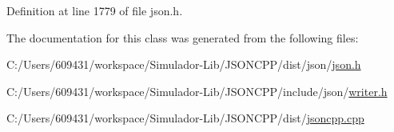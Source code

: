 Definition at line 1779 of file json.\+h.



The documentation for this class was generated from the following files\+:\begin{DoxyCompactItemize}
\item 
C\+:/\+Users/609431/workspace/\+Simulador-\/\+Lib/\+J\+S\+O\+N\+C\+P\+P/dist/json/\hyperlink{dist_2json_2json_8h}{json.\+h}\item 
C\+:/\+Users/609431/workspace/\+Simulador-\/\+Lib/\+J\+S\+O\+N\+C\+P\+P/include/json/\hyperlink{writer_8h}{writer.\+h}\item 
C\+:/\+Users/609431/workspace/\+Simulador-\/\+Lib/\+J\+S\+O\+N\+C\+P\+P/dist/\hyperlink{jsoncpp_8cpp}{jsoncpp.\+cpp}\end{DoxyCompactItemize}
